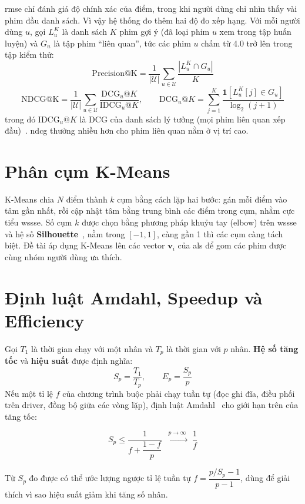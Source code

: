 \gls{rmse} chỉ đánh giá độ chính xác của điểm, trong khi người dùng chỉ nhìn thấy vài phim đầu danh sách. Vì vậy hệ thống đo thêm hai độ đo xếp hạng. Với mỗi người dùng $u$, gọi $L_u^K$ là danh sách $K$ phim gợi ý (đã loại phim $u$ xem trong tập huấn luyện) và $G_u$ là tập phim ``liên quan'', tức các phim $u$ chấm từ \num{4,0} trở lên trong tập kiểm thử:
\begin{equation}
  \mathrm{Precision@K} = \frac{1}{|\mathcal{U}|} \sum_{u \in \mathcal{U}} \frac{|L_u^K \cap G_u|}{K}
  \label{eq:precision}
\end{equation}
\begin{equation}
  \mathrm{NDCG@K} = \frac{1}{|\mathcal{U}|} \sum_{u \in \mathcal{U}} \frac{\mathrm{DCG}_u@K}{\mathrm{IDCG}_u@K},
  \qquad
  \mathrm{DCG}_u@K = \sum_{j=1}^{K} \frac{\mathbf{1}\left[ L_u^K[j] \in G_u \right]}{\log_2(j+1)}
  \label{eq:ndcg}
\end{equation}
trong đó $\mathrm{IDCG}_u@K$ là DCG của danh sách lý tưởng (mọi phim liên quan xếp đầu)~\cite{jarvelin2002ndcg}. \gls{ndcg} thưởng nhiều hơn cho phim liên quan nằm ở vị trí cao.

\section{Phân cụm K-Means}
\label{sec:kmeans}
K-Means chia $N$ điểm thành $k$ cụm bằng cách lặp hai bước: gán mỗi điểm vào tâm gần nhất, rồi cập nhật tâm bằng trung bình các điểm trong cụm, nhằm cực tiểu \gls{wssse}. Số cụm $k$ được chọn bằng phương pháp khuỷu tay (elbow) trên \gls{wssse} và hệ số \textbf{Silhouette}~\cite{rousseeuw1987silhouette}, nằm trong $[-1, 1]$, càng gần \num{1} thì các cụm càng tách biệt. Đề tài áp dụng K-Means lên các vector $\mathbf{v}_i$ của \gls{als} để gom các phim được cùng nhóm người dùng ưa thích.

\section{Định luật Amdahl, Speedup và Efficiency}
\label{sec:amdahl}
Gọi $T_1$ là thời gian chạy với một nhân và $T_p$ là thời gian với $p$ nhân. \textbf{Hệ số tăng tốc} và \textbf{hiệu suất} được định nghĩa:
\begin{equation}
  S_p = \frac{T_1}{T_p}, \qquad E_p = \frac{S_p}{p}
  \label{eq:speedup}
\end{equation}
Nếu một tỉ lệ $f$ của chương trình buộc phải chạy tuần tự (đọc ghi đĩa, điều phối trên driver, đồng bộ giữa các vòng lặp), định luật Amdahl~\cite{amdahl1967} cho giới hạn trên của tăng tốc:
\begin{ctbox}
\begin{equation}
  S_p \le \frac{1}{f + \dfrac{1-f}{p}} \;\xrightarrow{\;p \to \infty\;}\; \frac{1}{f}
  \label{eq:amdahl}
\end{equation}
\end{ctbox}
Từ $S_p$ đo được có thể ước lượng ngược tỉ lệ tuần tự $f = \dfrac{p/S_p - 1}{p - 1}$, dùng để giải thích vì sao hiệu suất giảm khi tăng số nhân.
